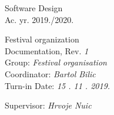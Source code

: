 \documentclass[12pt]{report}
\begin{document}
	

	\begin{titlepage}
		\begin{center}
			\LARGE Software Design\\
			\large Ac. yr. 2019./2020.\\
			
			
			\huge Festival organization\\
			\Large Documentation, Rev. \textit{1}\\
			
			\normalsize
			Group: \textit{Festival organisation}\\
			Coordinator: \textit{Bartol Bilic}\\
			
			
			Turn-in Date: \textit{15 . 11 . 2019.}\\
	
			
			Supervisor: \textit{Hrvoje Nuic}\\
		
		\end{center}

	
	\end{titlepage}

	
	\tableofcontents

	
	
	
	
	
	
	
	
	
	\begingroup
	\renewcommand*\listfigurename{Image and diagram index}
	\listoffigures
	\endgroup


	
	\eject 
		
	
\end{document}
